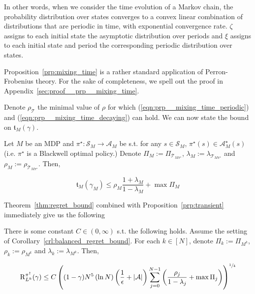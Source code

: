 \documentclass[anon,12pt]{colt2018} %
\newcommand{\AP}[1]{\left(#1\right)}
\newcommand{\Abs}[1]{\left\vert #1 \right\vert}
\newcommand{\A}{\mathcal{A}}
\newcommand{\St}{\mathcal{S}}
\newcommand{\T}{\mathcal{T}}
\newcommand{\Rg}{\operatorname{R}}
\newcommand{\Tn}{\mathfrak{t}}
\begin{document}
In other words, when we consider the time evolution of a Markov chain, the probability distribution over states converges to a convex linear combination of distributions that are periodic in time, with exponential convergence rate. $\zeta$ assigns to each initial state the asymptotic distribution over periods and $\xi$ assigns to each initial state and period the corresponding periodic distribution over states.

Proposition~\ref{prp:mixing_time} is a rather standard application of Perron-Frobenius theory. For the sake of completeness, we spell out the proof in Appendix~\ref{sec:proof__prp__mixing_time}.

Denote $\rho_\T$ the minimal value of $\rho$ for which (\ref{eqn:prp__mixing_time_periodic}) and (\ref{eqn:prp__mixing_time_decaying}) can hold. We can now state the bound on $\Tn_M(\gamma)$.

\begin{samepage}
\begin{proposition}
\label{prp:transient}

Let $M$ be an MDP and $\pi^\star: \St_M \rightarrow \A_M$ be s.t. for any $s \in \St_M$, $\pi^\star(s)\in\A_M^\star(s)$ (i.e. $\pi^\star$ is a Blackwell optimal policy.) Denote $\Pi_M:=\Pi_{\T_{M\pi^\star}}$, $\lambda_M:=\lambda_{\T_{M\pi^\star}}$ and $\rho_M:=\rho_{\T_{M\pi^\star}}$. Then,

\begin{equation}
\Tn_M\AP{\gamma_M} \leq \rho_M \frac{1+\lambda_M}{1-\lambda_M} + \max{\Pi_M}
\end{equation}

\end{proposition}
\end{samepage}

Theorem~\ref{thm:regret_bound} combined with Proposition~\ref{prp:transient} immediately give us the following

\begin{samepage}
\begin{corollary}
\label{crl:regret_bound_mixing}

There is some constant $C \in (0,\infty)$ s.t. the following holds. Assume the setting of Corollary~\ref{crl:balanced_regret_bound}. For each $k \in [N]$, denote $\Pi_k:=\Pi_{M^k}$, $\rho_k:=\rho_{M^k}$ and $\lambda_k:=\lambda_{M^k}$. Then,

\begin{equation}
\Rg_{L^k}^{\pi^\dagger}(\gamma)\leq C\AP{(1-\gamma)N^5 \AP{\ln N} \AP{\frac{1}{\epsilon}+\Abs{\A}}\sum_{j=0}^{N-1} \AP{\frac{\rho_j}{1-\lambda_j}+\max{\Pi_j}}}^{\sfrac{1}{4}}
\end{equation}

\end{corollary}
\end{samepage}
\end{document}
